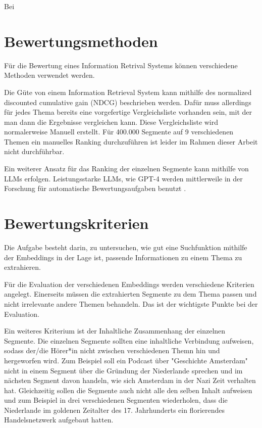 Bei



\section{Bewertungsmethoden}


Für die Bewertung eines Information Retrival Systems können verschiedene Methoden verwendet werden.


Die Güte von einem Information Retrieval System kann mithilfe des normalized discounted cumulative gain (NDCG) beschrieben werden. 
Dafür muss allerdings für jedes Thema bereits eine vorgefertige Vergleichsliste vorhanden sein, mit der man dann die Ergebnisse vergleichen kann.
Diese Vergleichsliste wird normalerweise Manuell erstellt.
Für 400.000 Segmente auf 9 verschiedenen Themen ein manuelles Ranking durchzuführen ist leider im Rahmen dieser Arbeit nicht durchführbar.

Ein weiterer Ansatz für das Ranking der einzelnen Segmente kann mithilfe von LLMs erfolgen.
Leistungsstarke LLMs, wie GPT-4 werden mittlerweile in der Forschung für automatische Bewertungsaufgaben benutzt \cite{naismith2023} \cite{nilsson2023}.



\section{Bewertungskriterien}


Die Aufgabe besteht darin, zu untersuchen, wie gut eine Suchfunktion mithilfe der Embeddings in der Lage ist, passende Informationen zu einem Thema zu extrahieren.

Für die Evaluation der verschiedenen Embeddings werden verschiedene Kriterien angelegt.
Einerseits müssen die extrahierten Segmente zu dem Thema passen und nicht irrelevante andere Themen behandeln.
Das ist der wichtigste Punkte bei der Evaluation.

Ein weiteres Kriterium ist der Inhaltliche Zusammenhang der einzelnen Segmente.
Die einzelnen Segmente sollten eine inhaltliche Verbindung aufweisen, sodass der/die Hörer*in nicht zwischen verschiedenen Themn hin und hergeworfen wird.
Zum Beispiel soll ein Podcast über "Geschichte Amsterdam" nicht in einem Segment über die Gründung der Niederlande sprechen und im nächsten Segment davon handeln, wie sich Amsterdam in der Nazi Zeit verhalten hat.
Gleichzeitig sollen die Segmente auch nicht alle den selben Inhalt aufweisen und zum Beispiel in drei verschiedenen Segmenten wiederholen, dass die Niederlande im goldenen Zeitalter des 17. Jahrhunderts ein florierendes Handelsnetzwerk aufgebaut hatten.
 



